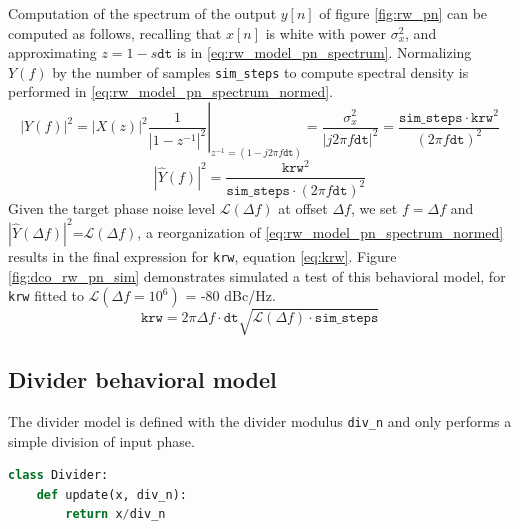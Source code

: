 Computation of the spectrum of the output $y[n]$ of figure \ref{fig:rw_pn} can be computed as follows, recalling that $x[n]$ is white with power $\sigma_x^2$, and approximating $z = 1-s\mathtt{dt}$ is in \ref{eq:rw_model_pn_spectrum}. Normalizing $Y(f)$ by the number of samples \texttt{sim\_steps} to compute spectral density is performed in \ref{eq:rw_model_pn_spectrum_normed}.
\begin{equation}\label{eq:rw_model_pn_spectrum}
|Y(f)|^{2} = \left.|X(z)|^{2}\frac{1}{|1-z^{-1}|^2}\right|_{z^{-1}=(1-j2\pi f\mathtt{dt})} = \frac{\sigma_x^2}{|j2\pi f\mathtt{dt}|^2} = \frac{\mathtt{sim\_steps}\cdot\texttt{krw}^2}{(2\pi f\mathtt{dt})^2}
\end{equation}
\begin{equation}\label{eq:rw_model_pn_spectrum_normed}
|\hat Y(f)|^{2} = \frac{\texttt{krw}^2}{\mathtt{sim\_steps}\cdot(2\pi f\mathtt{dt})^2}
\end{equation}
Given the target phase noise level $\mathcal{L}(\Delta f)$ at offset $\Delta f$, we set $f=\Delta f$ and $|\hat Y(\Delta f)|^{2}$=$\mathcal{L}(\Delta f)$, a reorganization of \ref{eq:rw_model_pn_spectrum_normed} results in the final expression for \texttt{krw}, equation \ref{eq:krw}. Figure \ref{fig:dco_rw_pn_sim} demonstrates simulated a test of this behavioral model, for \texttt{krw} fitted to $\mathcal{L}(\Delta f=10^6)$ = -80 dBc/Hz.
\begin{equation}\label{eq:krw}
\texttt{krw} = 2\pi \Delta f\cdot\mathtt{dt}\sqrt{\mathcal{L}(\Delta f)\cdot\mathtt{sim\_steps}}
\end{equation}



\subsection{Divider behavioral model}
The divider model is defined with the divider modulus \texttt{div\_n} and only performs a simple division of input phase. 
\begin{lstlisting}[language={Python}, caption={Divider behavioral model Python pseudocode.}, label={div_code}]
class Divider:
	def update(x, div_n):
		return x/div_n
\end{lstlisting}

